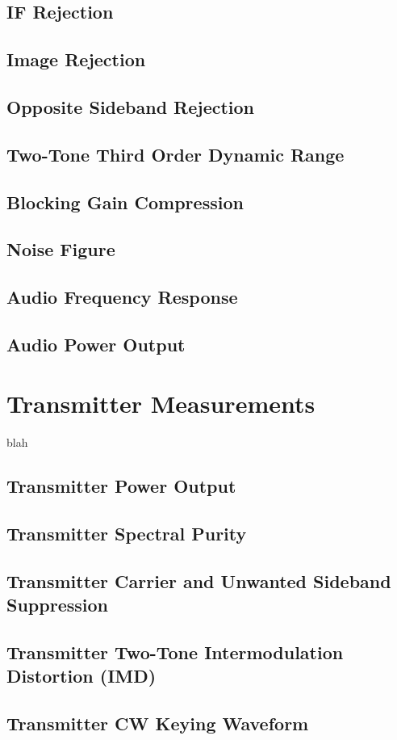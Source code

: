 \documentclass[10pt,letterpaper]{book}
\begin{document}
\section{IF Rejection}
\section{Image Rejection}
\section{Opposite Sideband Rejection}
\section{Two-Tone Third Order Dynamic Range}
\section{Blocking Gain Compression}
\section{Noise Figure}
\section{Audio Frequency Response}
\section{Audio Power Output}
\chapter{Transmitter Measurements}
blah
\section{Transmitter Power Output}
\section{Transmitter Spectral Purity}
\section{Transmitter Carrier and Unwanted Sideband Suppression}
\section{Transmitter Two-Tone Intermodulation Distortion (IMD)}
\section{Transmitter CW Keying Waveform}
\end{document}
